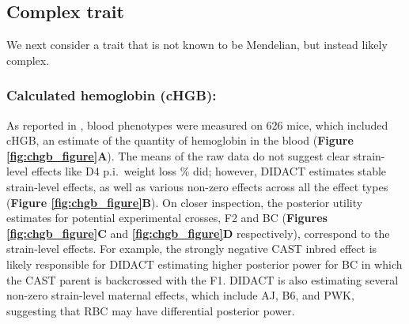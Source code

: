 \subsection{Complex trait}

We next consider a trait that is not known to be Mendelian, but instead likely complex. 
\subsubsection{Calculated hemoglobin (cHGB):} As reported in \cite{Lenarcic2012}, blood phenotypes were measured on 626 mice, which included cHGB, an estimate of the quantity of hemoglobin in the blood (\textbf{Figure \ref{fig:chgb_figure}A}). The means of the raw data do not suggest clear strain-level effects like D4 p.i.\ weight loss \% did; however, DIDACT estimates stable strain-level effects, as well as various non-zero effects across all the effect types (\textbf{Figure \ref{fig:chgb_figure}B}). On closer inspection, the posterior utility estimates for potential experimental crosses, F2 and BC (\textbf{Figures \ref{fig:chgb_figure}C} and \textbf{\ref{fig:chgb_figure}D} respectively), correspond to the strain-level effects. For example, the strongly negative CAST inbred effect is likely responsible for DIDACT estimating higher posterior power for BC in which the CAST parent is backcrossed with the F1. DIDACT is also estimating several non-zero strain-level maternal effects, which include AJ, B6, and PWK, suggesting that RBC may have differential posterior power.

